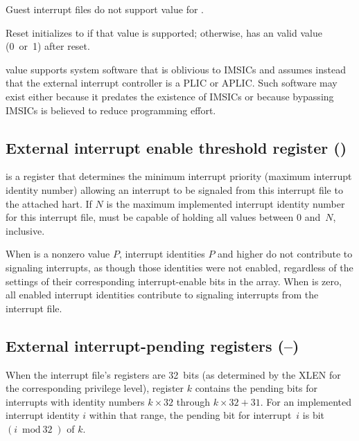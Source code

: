 Guest interrupt files do not support
value  for .

Reset initializes  to  if that value is
supported;
otherwise,  has an {\unspecified} valid value (0~or~1)
after reset.

\begin{commentary}
 value  supports system software that is
oblivious to IMSICs and assumes instead that the external interrupt
controller is a PLIC or APLIC.
Such software may exist either because it predates the existence of
IMSICs or because bypassing IMSICs is believed to reduce programming
effort.
\end{commentary}

\subsection{External interrupt enable threshold register ()}

 is a {\WLRL} register that determines the minimum
interrupt priority (maximum interrupt identity number) allowing an
interrupt to be signaled from this interrupt file to the attached hart.
If $N$ is the maximum implemented interrupt identity number for this
interrupt file,  must be capable of holding all values
between 0 and~$N$, inclusive.

When  is a nonzero value $P$, interrupt identities $P$
and higher do not contribute to signaling interrupts, as though those
identities were not enabled, regardless of the settings of their
corresponding interrupt-enable bits in the  array.
When  is zero, all enabled interrupt identities
contribute to signaling interrupts from the interrupt file.

\subsection{External interrupt-pending registers (--)}

When the interrupt file's registers are 32~bits (as determined by
the XLEN for the corresponding privilege level), register $k$
contains the pending bits for interrupts with identity numbers
$k\times\mbox{32}$ through ${k\times\mbox{32} + \mbox{31}}$.
For an implemented interrupt identity $i$ within that range, the
pending bit for interrupt~$i$ is bit $(i\bmod\mbox{32})$ of $k$.

